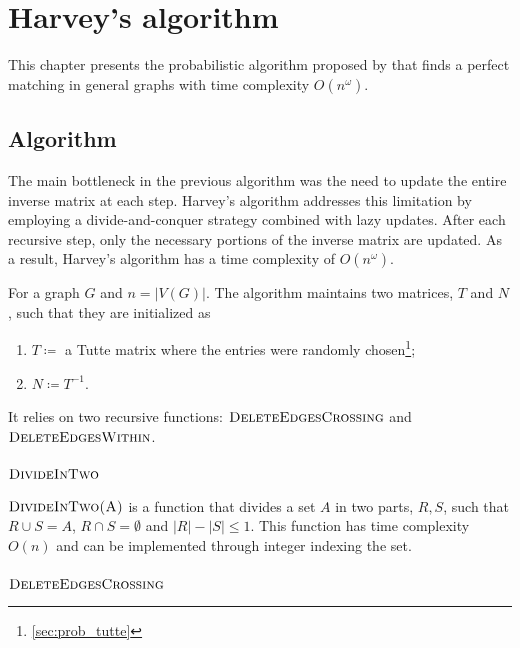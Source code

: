 \chapter{Harvey's algorithm}
\label{chap:harvey}

This chapter presents the probabilistic algorithm proposed by \citet{Harvey:Paper} that finds a perfect matching in general graphs with time complexity \(O(n^\omega)\).

\section{Algorithm}

The main bottleneck in the previous algorithm was the need to update the entire inverse matrix at each step. 
Harvey's algorithm addresses this limitation by employing a divide-and-conquer strategy combined with lazy updates. 
After each recursive step, only the necessary portions of the inverse matrix are updated.
As a result, Harvey's algorithm has a time complexity of \(O(n^\omega)\).

For a graph \(G\) and \(n = |V(G)|\). 
The algorithm maintains two matrices, \(T\) and \(N\), such that they are initialized as
\begin{enumerate}
    \item \(T \coloneqq \) a Tutte matrix where the entries were randomly chosen\footnote{\cref{sec:prob_tutte}};
    \item \(N \coloneqq T^{-1}\).
\end{enumerate}
It relies on two recursive functions: \(\textsc{DeleteEdgesCrossing}\) and \(\textsc{DeleteEdgesWithin}\). 

\subsection{\(\textsc{DivideInTwo}\)}
\(\textsc{DivideInTwo(A)}\) is a function that divides a set \(A\) in two parts, \(R, S\), such that \(R \cup S = A\), \(R \cap S = \emptyset\) and \(|R| - |S| \leq 1\).
This function has time complexity \(O(n)\) and can be implemented through integer indexing the set.

\subsection{\(\textsc{DeleteEdgesCrossing}\)}

